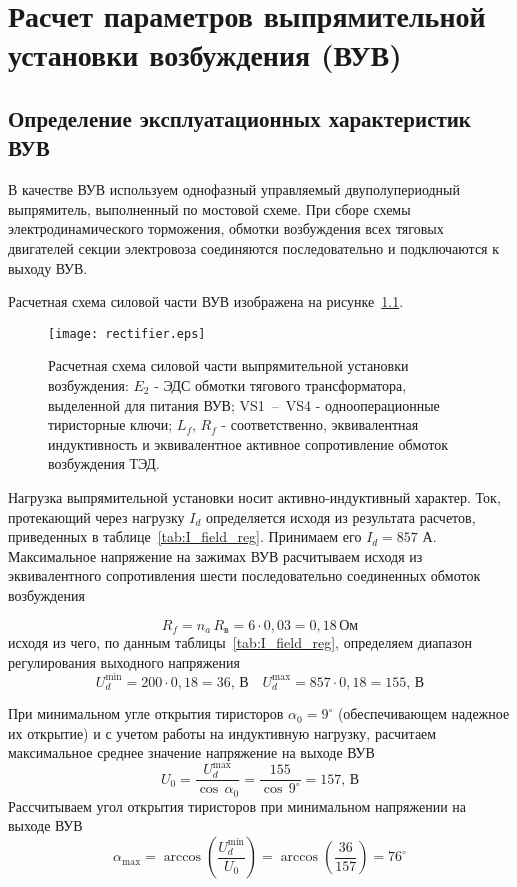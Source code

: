 \chapter{Расчет параметров выпрямительной установки возбуждения (ВУВ)}
\section{Определение эксплуатационных характеристик ВУВ}

В качестве ВУВ используем однофазный управляемый двуполупериодный выпрямитель, выполненный по мостовой схеме. При сборе схемы электродинамического торможения, обмотки возбуждения всех тяговых двигателей секции электровоза соединяются последовательно и подключаются к выходу ВУВ. 

Расчетная схема силовой части ВУВ изображена на рисунке~\ref{fig:vuv}.

\begin{figure}[H]
    \centering    
    \texttt{[image: rectifier.eps]}
    \caption{Расчетная схема силовой части выпрямительной установки возбуждения: $E_2$ - ЭДС обмотки тягового трансформатора, выделенной для питания ВУВ; VS1~--~VS4 - однооперационные тиристорные ключи; $L_f, \, R_f$ - соответственно, эквивалентная индуктивность и эквивалентное активное сопротивление обмоток возбуждения ТЭД.}
    \label{fig:vuv}
\end{figure}

Нагрузка выпрямительной установки носит активно-индуктивный характер. Ток, протекающий через нагрузку $I_d$ определяется исходя из результата расчетов, приведенных в таблице~\ref{tab:I_field_reg}. Принимаем его $I_d = 857$ А. Максимальное напряжение на зажимах ВУВ расчитываем исходя из эквивалентного сопротивления шести последовательно соединенных обмоток возбуждения

\begin{equation*}
 R_{f} = n_a \, R_{\text{в}} = 6 \cdot 0,03 = 0,18 \, \text{Ом}
\end{equation*}
исходя из чего, по данным таблицы~\ref{tab:I_field_reg}, определяем диапазон регулирования выходного напряжения
\begin{equation*}
 U_d^{\min} = 200 \cdot 0,18 = 36, \, \text{В} \quad U_d^{\max} = 857 \cdot 0,18 = 155, \, \text{В}
\end{equation*}

При минимальном угле открытия тиристоров $\alpha_0 = 9^\circ$ (обеспечивающем надежное их открытие) и с учетом работы на индуктивную нагрузку, расчитаем максимальное среднее значение напряжение на выходе ВУВ
\begin{equation*}
 U_0 = \frac{U_d^{\max}}{\cos \, \alpha_0} = \frac{155}{\cos \, 9^{\circ}} = 157, \, \text{В}
\end{equation*}
Рассчитываем угол открытия тиристоров при минимальном напряжении на выходе ВУВ
\begin{equation}
 \alpha_{\max} = \arccos \left( \frac{U_d^{\min}}{U_0} \right) = \arccos \left( \frac{36}{157} \right) = 76^{\circ}
\end{equation}

